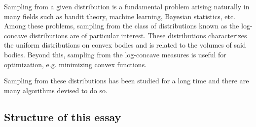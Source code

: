 Sampling from a given distribution is a fundamental problem arising naturally in many fields 
such as bandit theory, machine learning, Bayesian statistics, etc. Among these problems, sampling from the class of 
distributions known as the log-concave distributions are of particular interest.
These distributions characterizes the uniform distributions on convex bodies and is related to the volumes
of said bodies. Beyond this, sampling from the log-concave measures is useful for optimization, e.g. 
minimizing convex functions. 

Sampling from these distributions has been studied for a long time and there are many algorithms 
devised to do so. 





\subsection{Structure of this essay}